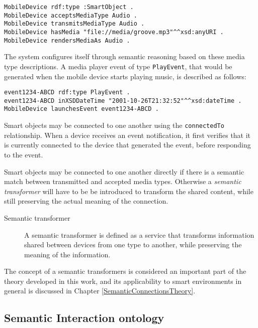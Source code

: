 {\footnotesize
\begin{verbatim}
MobileDevice rdf:type :SmartObject .
MobileDevice acceptsMediaType Audio .
MobileDevice transmitsMediaType Audio .
MobileDevice hasMedia "file://media/groove.mp3"^^xsd:anyURI .
MobileDevice rendersMediaAs Audio .
\end{verbatim}
}

The system configures itself through semantic reasoning based on these media type descriptions.  A media player event of type \texttt{PlayEvent}, that would be generated when the mobile device starts playing music, is described as follows:

{\footnotesize
\begin{verbatim}
event1234-ABCD rdf:type PlayEvent .
event1234-ABCD inXSDDateTime "2001-10-26T21:32:52"^^xsd:dateTime .
MobileDevice launchesEvent event1234-ABCD .
\end{verbatim}
}

Smart objects may be connected to one another using the \texttt{connectedTo} relationship. When a device receives an event notification, it first verifies that it is currently connected to the device that generated the event, before responding to the event.

Smart objects may be connected to one another directly if there is a semantic match between transmitted and accepted media types. Otherwise a \emph{semantic transformer} will have to be be introduced to transform the shared content, while still preserving the actual meaning of the connection. 

\begin{description}
	\item [Semantic transformer] A semantic transformer is defined as a service that transforms information shared between devices from one type to another, while preserving the meaning of the information.
\end{description}

The concept of a semantic transformers is considered an important part of the theory developed in this work, and its applicability to smart environments in general is discussed in Chapter \ref{SemanticConnectionsTheory}.



\subsection{Semantic Interaction ontology}
\label{sectionSemanticInteractionOntology}

